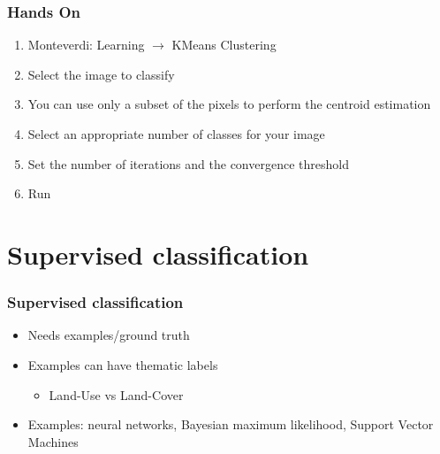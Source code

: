 \documentclass[compress]{beamer}
\begin{document}
\begin{frame}
  \frametitle{Hands On}
  \begin{enumerate}
  \item Monteverdi: Learning $\rightarrow$ KMeans Clustering
  \item Select the image to classify
  \item You can use only a subset of the pixels to perform the
    centroid estimation
  \item Select an appropriate number of classes for your image
  \item Set the number of iterations and the convergence threshold
  \item Run
  \end{enumerate}    
\end{frame}
\section[Supervised]{Supervised classification}
\label{sec:supervised}
\begin{frame}
  \frametitle{Supervised classification}
  \begin{itemize}
  \item Needs examples/ground truth
  \item Examples can have thematic labels
    \begin{itemize}
    \item Land-Use vs Land-Cover
    \end{itemize}
  \item Examples: neural networks, Bayesian maximum likelihood,
    Support Vector Machines
  \end{itemize}
\end{frame}
\end{document}

